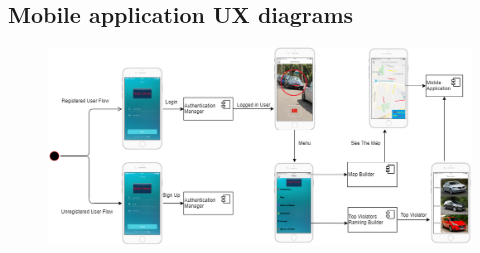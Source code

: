 \documentclass{article}
\begin{document}
	\subsection{Mobile application UX diagrams}
		\begin{figure}[h]
			\includegraphics[width=\linewidth]{images/UX_Login.png}
		\end{figure}
	\FloatBarrier \newpage
\end{document}
